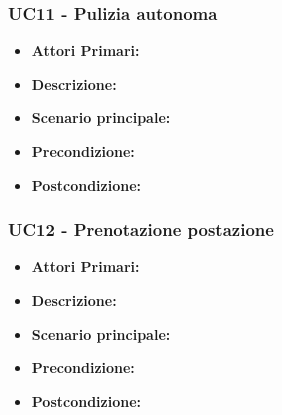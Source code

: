 \subsubsection{ UC11 - Pulizia autonoma}
\begin{itemize}
           	\item\textbf{Attori Primari:} 
           	\item\textbf{Descrizione:} 
           	\item\textbf{Scenario principale:} 
           	\item\textbf{Precondizione:} 
           	\item\textbf{Postcondizione:}
\end{itemize}

\subsubsection{ UC12 - Prenotazione postazione}
\begin{itemize}
           	\item\textbf{Attori Primari:} 
           	\item\textbf{Descrizione:} 
           	\item\textbf{Scenario principale:} 
           	\item\textbf{Precondizione:} 
           	\item\textbf{Postcondizione:}
\end{itemize}

